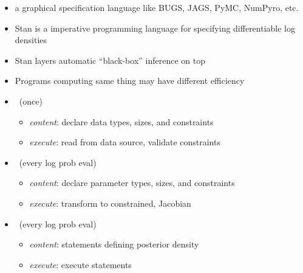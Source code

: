 \documentclass[10pt]{report}
\begin{document}
%
\begin{itemize}
\item {} a graphical specification language like BUGS, JAGS, PyMC, NumPyro, etc.
\item Stan is a  imperative programming language for specifying differentiable log densities
\item Stan layers automatic ``black-box'' inference on top
\item Programs computing same thing may have different efficiency
\end{itemize}


%
\begin{itemize}
\item {} \ (once)
  \vspace*{-4pt}
  \begin{itemize}\small
  \item {\slshape content}: declare data types, sizes, and constraints
  \item {\slshape execute}: read from data source, validate constraints
  \end{itemize}
\item {} \ (every log prob eval)
  \vspace*{-4pt}
  \begin{itemize}\small
  \item {\slshape content}: declare parameter types, sizes, and constraints
  \item {\slshape execute}: transform to constrained, Jacobian
  \end{itemize}
\item {} \ (every log prob eval)
  \vspace*{-4pt}
  \begin{itemize}\small
  \item {\slshape content}: statements defining posterior density
  \item {\slshape execute}: execute statements
  \end{itemize}
\end{itemize}
\end{document}
